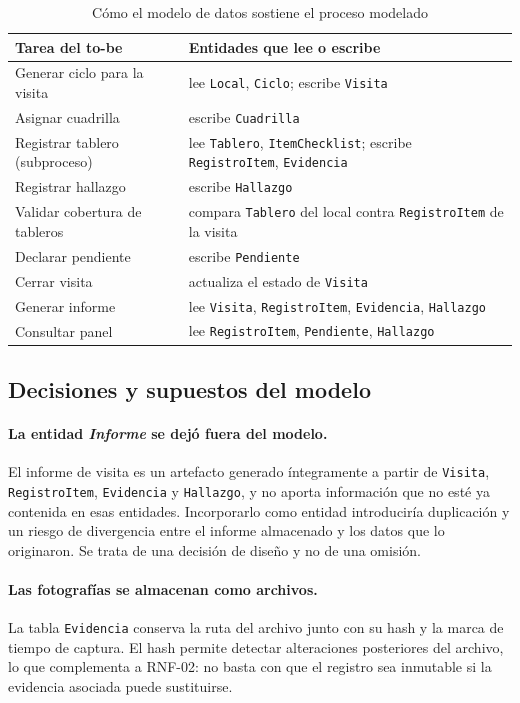 \documentclass[10pt,letterpaper]{article}
\begin{document}
\begin{table}[H]
\centering
\small
\begin{tabular}{@{}p{6cm}p{8.5cm}@{}}
\toprule
\textbf{Tarea del to-be} & \textbf{Entidades que lee o escribe} \\
\midrule
Generar ciclo para la visita & lee \texttt{Local}, \texttt{Ciclo}; escribe \texttt{Visita} \\
Asignar cuadrilla & escribe \texttt{Cuadrilla} \\
Registrar tablero (subproceso) & lee \texttt{Tablero}, \texttt{ItemChecklist}; escribe \texttt{RegistroItem}, \texttt{Evidencia} \\
Registrar hallazgo & escribe \texttt{Hallazgo} \\
Validar cobertura de tableros & compara \texttt{Tablero} del local contra \texttt{RegistroItem} de la visita \\
Declarar pendiente & escribe \texttt{Pendiente} \\
Cerrar visita & actualiza el estado de \texttt{Visita} \\
Generar informe & lee \texttt{Visita}, \texttt{RegistroItem}, \texttt{Evidencia}, \texttt{Hallazgo} \\
Consultar panel & lee \texttt{RegistroItem}, \texttt{Pendiente}, \texttt{Hallazgo} \\
\bottomrule
\end{tabular}
\caption{Cómo el modelo de datos sostiene el proceso modelado}
\end{table}

\subsection{Decisiones y supuestos del modelo}

\paragraph{La entidad \emph{Informe} se dejó fuera del modelo.} El informe de visita
es un artefacto generado íntegramente a partir de \texttt{Visita},
\texttt{RegistroItem}, \texttt{Evidencia} y \texttt{Hallazgo}, y no aporta información
que no esté ya contenida en esas entidades. Incorporarlo como entidad introduciría
duplicación y un riesgo de divergencia entre el informe almacenado y los datos que lo
originaron. Se trata de una decisión de diseño y no de una omisión.

\paragraph{Las fotografías se almacenan como archivos.} La tabla \texttt{Evidencia}
conserva la ruta del archivo junto con su hash y la marca de tiempo de captura. El
hash permite detectar alteraciones posteriores del archivo, lo que complementa a
RNF-02: no basta con que el registro sea inmutable si la evidencia asociada puede
sustituirse.
\end{document}
